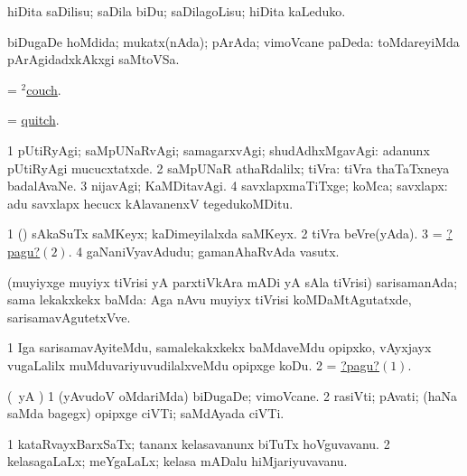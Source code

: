 \noindent
\gl{\pagu}
\bmng
{} hiDita saDilisu; saDila biDu; saDilagoLisu; hiDita kaLeduko. 
\emng
\eentry

\bentry
{}
\gl{\Agu}
\bmng
biDugaDe hoMdida; mukatx(nAda); pArAda; vimoVcane paDeda:  toMdareyiMda pArAgidadxkAkxgi saMtoVSa. 
\emng
\eentry

\bentry
{}
\gl{\nA}
\bmng
= \hyperref{kandict_c.pdf}{C}{couch(2)}{$^2$couch}. 
\emng
\eentry

\bentry
{}
\gl{\nA}
\bmng
= \hyperlink{quitch}{quitch}. 
\emng
\eentry

\bentry
{}
\gl{\kirxvi}
\bmng
\bnum
\num{1} pUtiRyAgi; saMpUNaRvAgi; samagarxvAgi; shudAdhxMgavAgi:  adanunx pUtiRyAgi mucucxtatxde. 
\num{2} saMpUNaR athaRdalilx; tiVra:  tiVra thaTaTxneya badalAvaNe. 
\num{3} nijavAgi; KaMDitavAgi. 
\num{4} savxlapxmaTiTxge; koMca; savxlapx:  adu savxlapx hecucx kAlavanenxV tegedukoMDitu. 
\enum
\emng

\noindent
\gl{\pagu}
\bmng
\bnum
\num{1}  (\AmA) sAkaSuTx saMKeyx; kaDimeyilalxda saMKeyx. 
\hypertarget{quite pagu2}{} 
\num{2}  tiVra beVre(yAda). 
\num{3}  = \hyperlink{quite pagu2}{?pagu?\((2)\)}. 
\num{4}  gaNaniVyavAdudu; gamanAhaRvAda vasutx. 
\enum
\emng
\eentry

\bentry
{}
\gl{\Agu}
\bmng
(muyiyxge muyiyx tiVrisi yA parxtiVkAra mADi yA sAla tiVrisi) sarisamanAda; sama lekakxkekx baMda:  Aga nAvu muyiyx tiVrisi koMDaMtAgutatxde, sarisamavAgutetxVve. 
\emng

\noindent
\gl{\pagu}
\bmng
\hypertarget{quits pagu1}{} 
\bnum
\num{1}  Iga sarisamavAyiteMdu, samalekakxkekx baMdaveMdu opipxko, vAyxjayx \mo vugaLalilx muMduvariyuvudilalxveMdu opipxge koDu. 
\num{2}  = \hyperlink{quits pagu1}{?pagu?\((1)\)}. 
\enum
\emng
\eentry

\bentry
{}
\gl{\nA}
\expl{}
\bmng
(\pArxparx\ yA \kAparx) 
\bnum
\num{1} (yAvudoV oMdariMda) biDugaDe; vimoVcane. 
\num{2} rasiVti; pAvati; (haNa saMda bagegx) opipxge ciVTi; saMdAyada ciVTi. 
\enum
\emng
\eentry

\bentry
{}
\gl{\nA}
\bmng
\bnum
\num{1} kataRvayxBarxSaTx; tananx kelasavanunx biTuTx hoVguvavanu. 
\num{2} kelasagaLaLx; meYgaLaLx; kelasa mADalu hiMjariyuvavanu. 
\enum
\emng
\eentry

